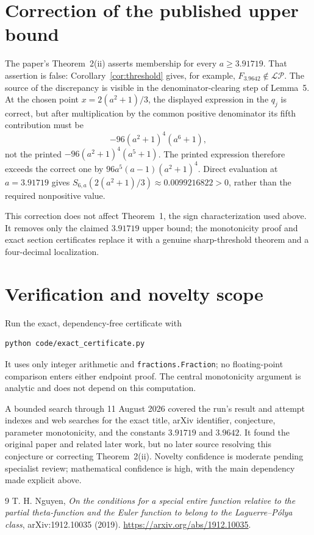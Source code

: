 \documentclass[11pt]{article}
\newcommand{\LP}{\mathcal{L\!P}}
\begin{document}
\section{Correction of the published upper bound}

The paper's Theorem~2(ii) asserts membership for every $a\geq3.91719$.
That assertion is false: Corollary~\ref{cor:threshold} gives, for example,
$F_{3.9642}\notin\LP$.  The source of the discrepancy is visible in the
denominator-clearing step of Lemma~5.  At the chosen point
$x=2(a^2+1)/3$, the displayed expression in the $q_j$ is correct, but after
multiplication by the common positive denominator its fifth contribution
must be
\[
 -96(a^2+1)^4(a^6+1),
\]
not the printed $-96(a^2+1)^4(a^5+1)$.  The printed expression therefore
exceeds the correct one by
$96a^5(a-1)(a^2+1)^4$.  Direct evaluation at $a=3.91719$ gives
$S_{6,a}(2(a^2+1)/3)\approx0.0099216822>0$, rather than the required
nonpositive value.

This correction does not affect Theorem~1, the sign characterization used
above.  It removes only the claimed $3.91719$ upper bound; the monotonicity
proof and exact section certificates replace it with a genuine sharp-threshold
theorem and a four-decimal localization.

\section{Verification and novelty scope}

Run the exact, dependency-free certificate with
\begin{verbatim}
python code/exact_certificate.py
\end{verbatim}
It uses only integer arithmetic and \texttt{fractions.Fraction}; no
floating-point comparison enters either endpoint proof.  The central
monotonicity argument is analytic and does not depend on this computation.

A bounded search through 11 August 2026 covered the run's result and attempt
indexes and web searches for the exact title, arXiv identifier, conjecture,
parameter monotonicity, and the constants $3.91719$ and $3.9642$.  It found
the original paper and related later work, but no later source resolving this
conjecture or correcting Theorem~2(ii).  Novelty confidence is moderate
pending specialist review; mathematical confidence is high, with the main
dependency made explicit above.

\begin{thebibliography}{9}
T. H. Nguyen,
\emph{On the conditions for a special entire function relative to the
partial theta-function and the Euler function to belong to the
Laguerre--P\'olya class}, arXiv:1912.10035 (2019).
\url{https://arxiv.org/abs/1912.10035}.
\end{thebibliography}
\end{document}
